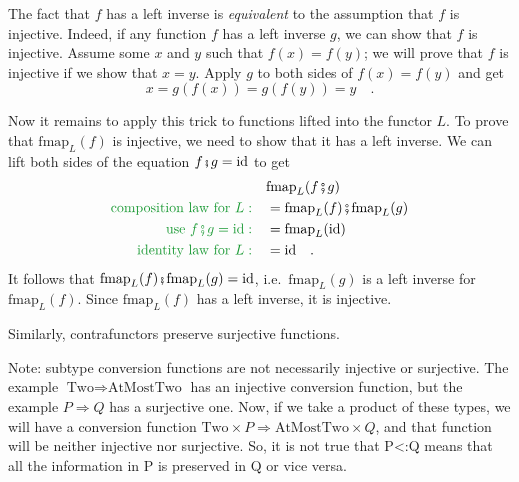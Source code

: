 The fact that $f$ has a left inverse is \emph{equivalent} to the
assumption that $f$ is injective. Indeed, if any function $f$ has
a left inverse $g$, we can show that $f$ is injective. Assume some
$x$ and $y$ such that $f(x)=f(y)$; we will prove that $f$ is injective
if we show that $x=y$. Apply $g$ to both sides of $f(x)=f(y)$ and
get
\[
x=g(f(x))=g(f(y))=y\quad.
\]

Now it remains to apply this trick to functions lifted into the functor
$L$. To prove that $\text{fmap}_{L}(f)$ is injective, we need to
show that it has a left inverse. We can lift both sides of the equation
$f\bef g=\text{id}$ to get
\begin{align*}
 & \text{fmap}_{L}(f\bef g)\\
{\color{greenunder}\text{composition law for }L:}\quad & =\text{fmap}_{L}(f)\bef\text{fmap}_{L}(g)\\
{\color{greenunder}\text{use }f\bef g=\text{id}:}\quad & =\text{fmap}_{L}(\text{id})\\
{\color{greenunder}\text{identity law for }L:}\quad & =\text{id}\quad.
\end{align*}
It follows that $\text{fmap}_{L}(f)\bef\text{fmap}_{L}(g)=\text{id}$,
i.e.~$\text{fmap}_{L}(g)$ is a left inverse for $\text{fmap}_{L}(f)$.
Since $\text{fmap}_{L}(f)$ has a left inverse, it is injective.

Similarly, contrafunctors preserve surjective functions.

Note: subtype conversion functions are not necessarily injective or
surjective. The example $\text{Two}\Rightarrow\text{AtMostTwo}$ has
an injective conversion function, but the example $P\Rightarrow Q$
has a surjective one. Now, if we take a product of these types, we
will have a conversion function $\text{Two}\times P\Rightarrow\text{AtMostTwo}\times Q$,
and that function will be neither injective nor surjective. So, it
is not true that P<:Q means that all the information in P is preserved
in Q or vice versa.

